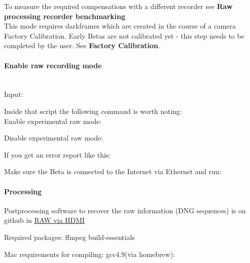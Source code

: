To measure the required compensations with a different recorder see \textbf{Raw processing recorder benchmarking}\\

This mode requires darkframes which are created in the course of a camera Factory Calibration. Early Betas are not calibrated yet - this step needs to be completed by the user. See \textbf{Factory Calibration}.\\




\paragraph{Enable raw recording mode}\mbox{}\\

Input:


Inside that script the following command is worth noting:\\

Enable experimental raw mode: 


Disable experimental raw mode: 


If you get an error report like this: 


Make sure the Beta is connected to the Internet via Ethernet and run:     





\paragraph{Processing}

Postprocessing software to recover the raw information (DNG sequences) is on github in \href{https://github.com/apertus-open-source-cinema/misc-tools-utilities/tree/master/raw-via-hdmi}{RAW via HDMI}

Required packages: ffmpeg build-essentials

Mac requirements for compiling: gcc4.9(via homebrew): 


